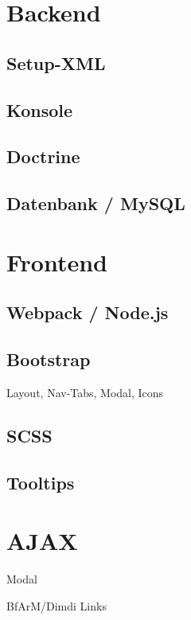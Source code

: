 \section{Backend}

\subsection{Setup-XML}

\subsection{Konsole}

\subsection{Doctrine}

\subsection{Datenbank / MySQL}

\section{Frontend}

\subsection{Webpack / Node.js}

\subsection{Bootstrap}

Layout, Nav-Tabs, Modal, Icons

\subsection{SCSS}

\subsection{Tooltips}

\section{AJAX}

Modal

BfArM/Dimdi Links

